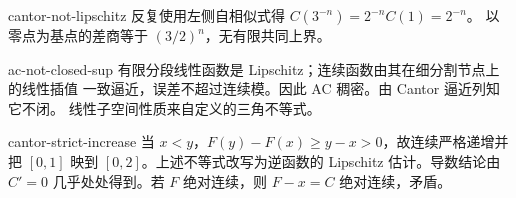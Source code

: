 \begin{solution}{cantor-not-lipschitz}
反复使用左侧自相似式得 \(C(3^{-n})=2^{-n}C(1)=2^{-n}\)。
以零点为基点的差商等于 \((3/2)^n\)，无有限共同上界。
\end{solution}
\begin{solution}{ac-not-closed-sup}
有限分段线性函数是 Lipschitz；连续函数由其在细分割节点上的线性插值
一致逼近，误差不超过连续模。因此 AC 稠密。由 Cantor 逼近列知它不闭。
线性子空间性质来自定义的三角不等式。
\end{solution}
\begin{solution}{cantor-strict-increase}
当 \(x<y\)，\(F(y)-F(x)\ge y-x>0\)，故连续严格递增并把 \([0,1]\)
映到 \([0,2]\)。上述不等式改写为逆函数的 Lipschitz 估计。导数结论由
\(C'=0\) 几乎处处得到。若 \(F\) 绝对连续，则 \(F-x=C\) 绝对连续，矛盾。
\end{solution}
